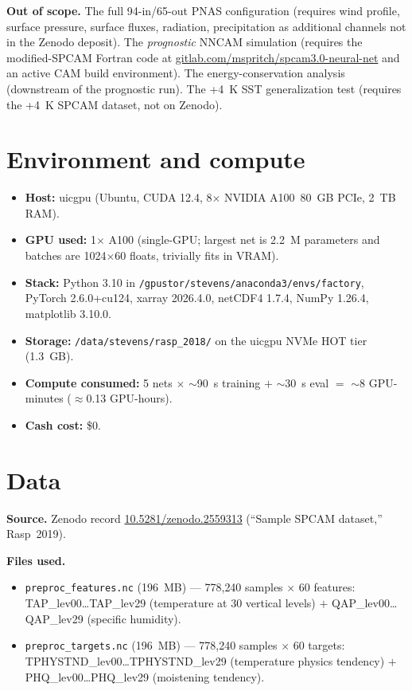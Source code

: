 \documentclass[11pt]{article}
\begin{document}
\textbf{Out of scope.} The full 94-in/65-out PNAS configuration (requires
wind profile, surface pressure, surface fluxes, radiation, precipitation as
additional channels not in the Zenodo deposit). The \emph{prognostic} NNCAM
simulation (requires the modified-SPCAM Fortran code at
\href{https://gitlab.com/mspritch/spcam3.0-neural-net}{gitlab.com/mspritch/spcam3.0-neural-net}
and an active CAM build environment). The energy-conservation analysis
(downstream of the prognostic run). The +4~K SST generalization test
(requires the +4~K SPCAM dataset, not on Zenodo).

\section{Environment and compute}
\begin{itemize}
\item \textbf{Host:} uicgpu (Ubuntu, CUDA 12.4, 8$\times$ NVIDIA A100~80~GB PCIe, 2~TB RAM).
\item \textbf{GPU used:} 1$\times$ A100 (single-GPU; largest net is 2.2~M parameters and batches are 1024$\times$60 floats, trivially fits in VRAM).
\item \textbf{Stack:} Python 3.10 in \texttt{/gpustor/stevens/anaconda3/envs/factory}, PyTorch 2.6.0+cu124, xarray 2026.4.0, netCDF4 1.7.4, NumPy 1.26.4, matplotlib 3.10.0.
\item \textbf{Storage:} \texttt{/data/stevens/rasp\_2018/} on the uicgpu NVMe HOT tier (1.3~GB).
\item \textbf{Compute consumed:} 5 nets $\times$ $\sim$90~s training $+$ $\sim$30~s eval $=$ $\sim$8 GPU-minutes ($\approx$0.13 GPU-hours).
\item \textbf{Cash cost:} \$0.
\end{itemize}

\section{Data}
\textbf{Source.} Zenodo record
\href{https://doi.org/10.5281/zenodo.2559313}{10.5281/zenodo.2559313}
(``Sample SPCAM dataset,'' Rasp~2019).

\textbf{Files used.}
\begin{itemize}
\item \texttt{preproc\_features.nc} (196~MB) --- 778{,}240 samples $\times$
  60 features: TAP\_lev00\dots TAP\_lev29 (temperature at 30 vertical levels)
  $+$ QAP\_lev00\dots QAP\_lev29 (specific humidity).
\item \texttt{preproc\_targets.nc} (196~MB) --- 778{,}240 samples $\times$
  60 targets: TPHYSTND\_lev00\dots TPHYSTND\_lev29 (temperature physics
  tendency) $+$ PHQ\_lev00\dots PHQ\_lev29 (moistening tendency).
\end{itemize}
\end{document}
